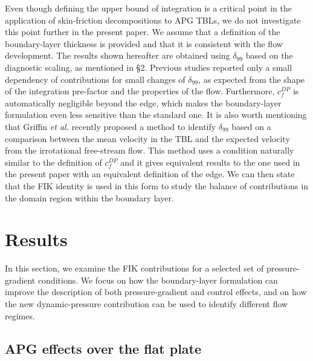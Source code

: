 Even though defining the upper bound of integration is a critical point in the application of skin-friction decompositions to APG TBLs, we do not investigate this point further in the present paper. We assume that a definition of the boundary-layer thickness is provided and that it is consistent with the flow development. The results shown hereafter are obtained using $\delta_{99}$ based on the diagnostic scaling, as mentioned in \S2. Previous studies reported only a small dependency of contributions for small changes of $\delta_{99}$, as expected from the shape of the integration pre-factor and the properties of the flow\cite{atzo21}. Furthermore, $c^{DP}_f$ is automatically negligible beyond the edge, which makes the boundary-layer formulation even less sensitive than the standard one. It is also worth mentioning that Griffin \textit{et al.}\cite{grif21} recently proposed a method to identify $\delta_{99}$ based on a comparison between the mean velocity in the TBL and the expected velocity from the irrotational free-stream flow. This method uses a condition naturally similar to the definition of $c^{DP}_f$ and it gives equivalent results to the one used in the present paper with an equivalent definition of the edge. We can then state that the FIK identity is used in this form to study the balance of contributions in the domain region within the boundary layer. 



\section{Results}
In this section, we examine the FIK contributions for a selected set of pressure-gradient conditions. We focus on how the boundary-layer formulation can improve the description of both pressure-gradient and control effects, and on how the new dynamic-pressure contribution can be used to identify different flow regimes.

\subsection{APG effects over the flat plate}

